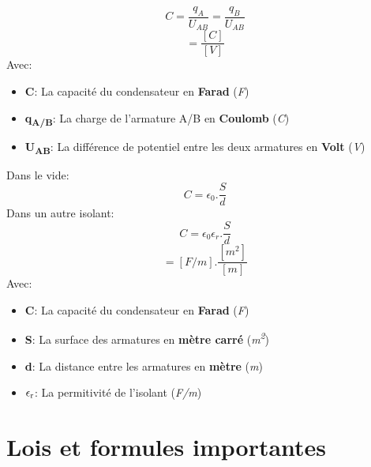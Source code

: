  \begin{equation}
	 C = \frac{q_{A}}{U_{AB}} =\frac{q_{B}}{U_{AB}}
 \end{equation}
 \begin{equation}
	 [F] = \frac{[C]}{[V]}
 \end{equation}
 Avec:
 \begin{itemize}
	 \item \textbf{C}: La capacité du condensateur en \textbf{Farad} (\textit{F})
	 \item \textbf{q\textsubscript{A/B}}: La charge de l'armature A/B en \textbf{Coulomb} (\textit{C})
	 \item \textbf{U\textsubscript{AB}}: La différence de potentiel entre les deux armatures en \textbf{Volt} (\textit{V})
 \end{itemize}

 Dans le vide:
 \begin{equation}
	 C = \epsilon_{0}.\frac{S}{d}
 \end{equation}
 Dans un autre isolant:
 \begin{equation}
	 C = \epsilon_{0}\epsilon_{r}.\frac{S}{d}
 \end{equation}
 \begin{equation}
	 [F] = [F/m].\frac{[m^2]}{[m]}
 \end{equation}
 Avec:
 \begin{itemize}
	 \item \textbf{C}: La capacité du condensateur en \textbf{Farad} (\textit{F})
	 \item \textbf{S}: La surface des armatures en \textbf{mètre carré} (\textit{m\textsuperscript{2}})
	 \item \textbf{d}: La distance entre les armatures en \textbf{mètre} (\textit{m})
	 \item \textbf{$\epsilon\textsubscript{r}$}: La permitivité de l'isolant (\textit{F/m})

 \end{itemize}



 \section{Lois et formules importantes}

